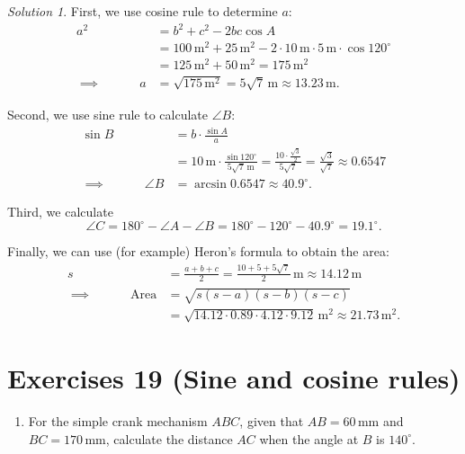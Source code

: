 \documentclass[
  12pt,
  oneside]{book}
\providecommand{\tightlist}{%
  \setlength{\itemsep}{0pt}\setlength{\parskip}{0pt}}
\theoremstyle{definition}
\theoremstyle{definition}
\theoremstyle{definition}
\theoremstyle{definition}
\theoremstyle{remark}
\newtheorem*{solution}{Solution}
\begin{document}
\begin{solution}
First, we use cosine rule to determine \(a\):
\begin{align*}
a^2 &= b^2+c^2-2bc\cos A\\
&= 100\,\mathrm{m^2} + 25 \,\mathrm{m^2} - 2\cdot 10\,\mathrm{m}\cdot 5\,\mathrm{m}\cdot \cos 120^\circ\\
&= 125\,\mathrm{m^2} + 50 \,\mathrm{m^2} = 175 \,\mathrm{m^2}\\
\implies\quad\quad\quad a &= \sqrt{175\,\mathrm{m^2}} =5\sqrt{7}\,\mathrm{m} \approx 13.23\,\mathrm{m}.
\end{align*}

Second, we use sine rule to calculate \(\angle B\):
\begin{align*}
\sin B &= b\cdot\frac{\sin A}{a}\\
&= 10\,\mathrm{m}\cdot \frac{\sin 120^\circ}{5\sqrt{7}\,\mathrm{m}} = \frac{10\cdot \frac{\sqrt{3}}{2}}{5\sqrt{7}} =\frac{\sqrt{3}}{\sqrt{7}}\approx 0.6547\\
\implies\quad\quad\quad \angle B &= \arcsin 0.6547 \approx 40.9^\circ.
\end{align*}

Third, we calculate
\[
\angle C = 180^\circ - \angle A-\angle B = 180^\circ- 120^\circ - 40.9^\circ = 19.1^\circ.
\]

Finally, we can use (for example) Heron's formula to obtain the area:
\begin{align*}
s &= \frac{a+b+c}{2} = \frac{10+5+5\sqrt{7}}{2}\,\mathrm{m} \approx 14.12\,\mathrm{m}\\
\implies\quad\quad\quad \mathrm{Area} &= 
\sqrt{s(s-a)(s-b)(s-c)}\\
&=\sqrt{14.12\cdot 0.89\cdot 4.12\cdot 9.12} \,\mathrm{m^2} \approx 21.73\,\mathrm{m^2}.
\end{align*}
\end{solution}

\chapter*{Exercises 19 (Sine and cosine rules)}\label{exercises-19-sine-and-cosine-rules}

\begin{enumerate}
\def\labelenumi{\arabic{enumi}.}
\tightlist
\item
  For the simple crank mechanism \(ABC\), given that \(AB = 60\,\mathrm{mm}\) and \(BC = 170\,\mathrm{mm}\), calculate the distance \(AC\) when the angle at \(B\) is \(140^\circ\).
\end{enumerate}
\end{document}

